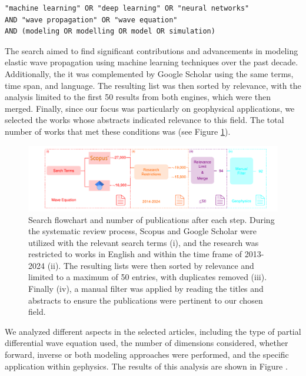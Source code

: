 \documentclass[11pt,twoside]{article}
\begin{document}
\begin{verbatim}
"machine learning" OR "deep learning" OR "neural networks" 
AND "wave propagation" OR "wave equation" 
AND (modeling OR modelling OR model OR simulation)
\end{verbatim}

The search aimed to find significant contributions and advancements in modeling elastic wave propagation using machine learning techniques over the past decade. Additionally, the it was complemented by Google Scholar using the same terms, time span, and language. The resulting list was then sorted by relevance, with the analysis limited to the first 50 results from both engines, which were then merged. Finally, since our focus was particularly on geophysical applications, we selected the works whose abstracts indicated relevance to this field. The total number of works that met these conditions was  (see Figure \ref{fig:Escheme_Systematic_Review}).

\begin{figure}
    \includegraphics[width=1.0\textwidth]{figs/Escheme_Systematic_Review.pdf}
\caption{Search flowchart and number of publications after each step. During the systematic review process, Scopus and Google Scholar were utilized with the relevant search terms (i), and the research was restricted to works in English and within the time frame of 2013-2024 (ii). The resulting lists were then sorted by relevance and limited to a maximum of 50 entries, with duplicates removed (iii). Finally (iv), a manual filter was applied by reading the titles and abstracts to ensure the publications were pertinent to our chosen field.}
    \label{fig:Escheme_Systematic_Review}
\end{figure}


We analyzed different aspects in the selected articles, including the type of partial differential wave equation used, the number of dimensions considered, whether forward, inverse or both modeling approaches were performed, and the specific application within gephysics. The results of this analysis are shown in Figure  .
\end{document}
